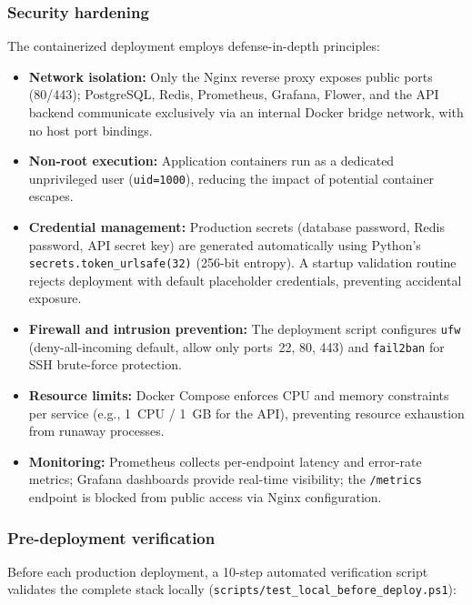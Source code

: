 \documentclass[preprint,review,12pt]{elsarticle}
\begin{document}
\subsubsection*{Security hardening}

The containerized deployment employs defense-in-depth principles:

\begin{itemize}
\item \textbf{Network isolation:} Only the Nginx reverse proxy exposes
  public ports (80/443); PostgreSQL, Redis, Prometheus, Grafana, Flower,
  and the API backend communicate exclusively via an internal Docker
  bridge network, with no host port bindings.
\item \textbf{Non-root execution:} Application containers run as a
  dedicated unprivileged user (\texttt{uid=1000}), reducing the impact
  of potential container escapes.
\item \textbf{Credential management:} Production secrets (database
  password, Redis password, API secret key) are generated
  automatically using Python's \texttt{secrets.token\_urlsafe(32)}
  (256-bit entropy). A startup validation routine rejects deployment
  with default placeholder credentials, preventing accidental exposure.
\item \textbf{Firewall and intrusion prevention:} The deployment script
  configures \texttt{ufw} (deny-all-incoming default, allow only
  ports~22, 80, 443) and \texttt{fail2ban} for SSH brute-force
  protection.
\item \textbf{Resource limits:} Docker Compose enforces CPU and memory
  constraints per service (e.g., 1~CPU / 1~GB for the API), preventing
  resource exhaustion from runaway processes.
\item \textbf{Monitoring:} Prometheus collects per-endpoint latency and
  error-rate metrics; Grafana dashboards provide real-time visibility;
  the \texttt{/metrics} endpoint is blocked from public access via
  Nginx configuration.
\end{itemize}

\subsubsection*{Pre-deployment verification}

Before each production deployment, a 10-step automated verification
script validates the complete stack locally
(\texttt{scripts/test\_local\_before\_deploy.ps1}):
\end{document}
